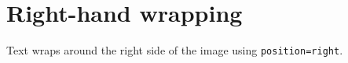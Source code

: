 \documentclass{article}
\begin{document}
\section*{Right-hand wrapping}

Text wraps around the right side of the image using \texttt{position=right}.

\lipsum[1-8]
\end{document}
